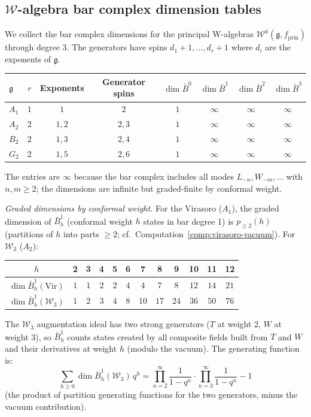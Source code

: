 \subsection{$\mathcal{W}$-algebra bar complex dimension tables}

\begin{computation}
\label{comp:w-bar-dims}

We collect the bar complex dimensions for the principal W-algebras
$\mathcal{W}^k(\mathfrak{g}, f_{\mathrm{prin}})$ through degree 3.
The generators have spins $d_1+1, \ldots, d_r+1$ where $d_i$ are the
exponents of $\mathfrak{g}$.

\begin{center}
\renewcommand{\arraystretch}{1.3}
\begin{tabular}{l|ccc|cccc}
$\mathfrak{g}$ & $r$ & Exponents & Generator spins &
$\dim\bar{B}^0$ & $\dim\bar{B}^1$ & $\dim\bar{B}^2$ &
$\dim\bar{B}^3$ \\
\hline
$A_1$ & $1$ & $1$ & $2$ & $1$ & $\infty$ & $\infty$ & $\infty$ \\
$A_2$ & $2$ & $1,2$ & $2,3$ & $1$ & $\infty$ & $\infty$ & $\infty$ \\
$B_2$ & $2$ & $1,3$ & $2,4$ & $1$ & $\infty$ & $\infty$ & $\infty$ \\
$G_2$ & $2$ & $1,5$ & $2,6$ & $1$ & $\infty$ & $\infty$ & $\infty$
\end{tabular}
\end{center}
The entries are $\infty$ because the bar complex includes all modes
$L_{-n}, W_{-m}, \ldots$ with $n, m \geq 2$; the dimensions are infinite
but graded-finite by conformal weight.

\emph{Graded dimensions by conformal weight.}
For the Virasoro ($A_1$), the graded dimension of $\bar{B}^1_h$
(conformal weight $h$ states in bar degree 1) is $p_{\geq 2}(h)$
(partitions of $h$ into parts $\geq 2$; cf.\
Computation~\ref{comp:virasoro-vacuum}).
For $\mathcal{W}_3$ ($A_2$):
\begin{center}
\renewcommand{\arraystretch}{1.2}
\begin{tabular}{c|ccccccccccc}
$h$ & 2 & 3 & 4 & 5 & 6 & 7 & 8 & 9 & 10 & 11 & 12 \\
\hline
$\dim \bar{B}^1_h(\mathrm{Vir})$ &
$1$ & $1$ & $2$ & $2$ & $4$ & $4$ & $7$ & $8$ & $12$ & $14$ & $21$ \\
$\dim \bar{B}^1_h(\mathcal{W}_3)$ &
$1$ & $2$ & $3$ & $4$ & $8$ & $10$ & $17$ & $24$ & $36$ & $50$ & $76$
\end{tabular}
\end{center}
The $\mathcal{W}_3$ augmentation ideal has two strong generators
($T$ at weight 2, $W$ at weight 3), so $\bar{B}^1_h$ counts states
created by all composite fields built from $T$ and $W$ and their
derivatives at weight $h$ (modulo the vacuum).  The generating function
is:
\[
\sum_{h \geq 0} \dim \bar{B}^1_h(\mathcal{W}_3)\, q^h
= \prod_{n=2}^{\infty} \frac{1}{1-q^n}
\cdot \prod_{n=3}^{\infty} \frac{1}{1-q^n} - 1
\]
(the product of partition generating functions for the two generators,
minus the vacuum contribution).


\end{computation}
